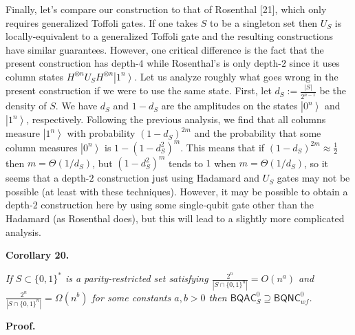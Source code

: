 Finally, let’s compare our construction to that of Rosenthal [21], which only requires generalized Toffoli gates. If one takes $S$ to be a singleton set then $U_{S}$ is locally-equivalent to a generalized Toffoli gate and the resulting constructions have similar guarantees. However, one critical difference is the fact that the present construction has depth-$4$ while Rosenthal’s is only depth-$2$ since it uses column states $H^{\otimes n}U_{S}H^{\otimes n}\left|1^{n}\right\rangle$. Let us analyze roughly what goes wrong in the present construction if we were to use the same state. First, let $d_{S}:=\frac{|S|}{2^{n-1}}$ be the density of $S$. We have $d_{S}$ and $1-d_{S}$ are the amplitudes on the states $\left|0^{n}\right\rangle$ and $\left|1^{n}\right\rangle$, respectively. Following the previous analysis, we find that all columns measure $\left|1^{n}\right\rangle$ with probability $(1-d_{S})^{2m}$ and the probability that some column measures $\left|0^{n}\right\rangle$ is $1-(1-d_{S}^{2})^{m}$. This means that if $(1-d_{S})^{2m}\approx\frac{1}{2}$ then $m=\Theta(1/d_{S})$, but $(1-d_{S}^{2})^{m}$ tends to $1$ when $m=\Theta(1/d_{S})$, so it seems that a depth-$2$ construction just using Hadamard and $U_{S}$ gates may not be possible (at least with these techniques). However, it may be possible to obtain a depth-$2$ construction here by using some single-qubit gate other than the Hadamard (as Rosenthal does), but this will lead to a slightly more complicated analysis.\par





\par\medskip\noindent\textbf{
\textbf{Corollary 20}\textbf{.}
}\par



\emph{If $S\subset\{0,1\}^{*}$ is a parity-restricted set satisfying $\frac{2^{n}}{|S\cap\{0,1\}^{n}|}=O(n^{a})$ and $\frac{2^{n}}{|S\cap\{0,1\}^{n}|}=\Omega(n^{b})$ for some constants $a,b>0$ then ${\mathsf{BQAC}}^{0}_{S}\supseteq{\mathsf{BQNC}}^{0}_{wf}$.}\par







\par\medskip\noindent\textbf{Proof.}\par




